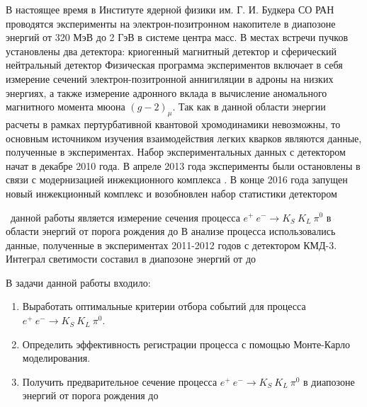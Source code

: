 {\actuality}
В настоящее время в Институте ядерной физики им. Г. И. Будкера СО РАН проводятся эксперименты на электрон-позитронном накопителе  \cite{VEPP} в диапозоне энергий от 320 МэВ до 2 ГэВ в системе центра масс. В местах встречи пучков установлены два детектора: криогенный магнитный детектор  и сферический нейтральный детектор  Физическая программа экспериментов включает в себя измерение сечений электрон-позитронной аннигиляции в адроны на низких энергиях, а также измерение адронного вклада в вычисление аномального магнитного момента мюона {$(g-2)_\mu$}. Так как в данной области энергии расчеты в рамках пертурбативной квантовой хромодинамики невозможны, то основным источником изучения взаимодействия легких кварков являются данные, полученные в экспериментах. Набор экспериментальных данных с детектором  начат в декабре 2010 года. В апреле 2013 года эксперименты были остановлены в связи с модернизацией инжекционного комплекса \cite{status}. В конце 2016 года запущен новый инжекционный комплекс  и возобновлен набор статистики детектором 

 \aim\ данной работы является измерение сечения процесса {$e^+\:e^- \to K_{S}\:K_{L}\:\pi^0$}
 в области энергий от порога рождения  до  В анализе процесса использовались данные, полученные в экспериментах 2011-2012 годов с детектором КМД-3. Интеграл светимости составил  в диапозоне энергий от  до 

В задачи данной работы входило:
\begin{enumerate}
  \item Выработать оптимальные критерии отбора событий для процесса {$e^+\:e^- \to K_{S}\:K_{L}\:\pi^0$}.
  \item Определить эффективность регистрации процесса с помощью Монте-Карло моделирования.
  \item Получить предварительное сечение процесса {$e^+\:e^- \to K_{S}\:K_{L}\:\pi^0$} в диапозоне энергий от порога рождения  до 
\end{enumerate}


